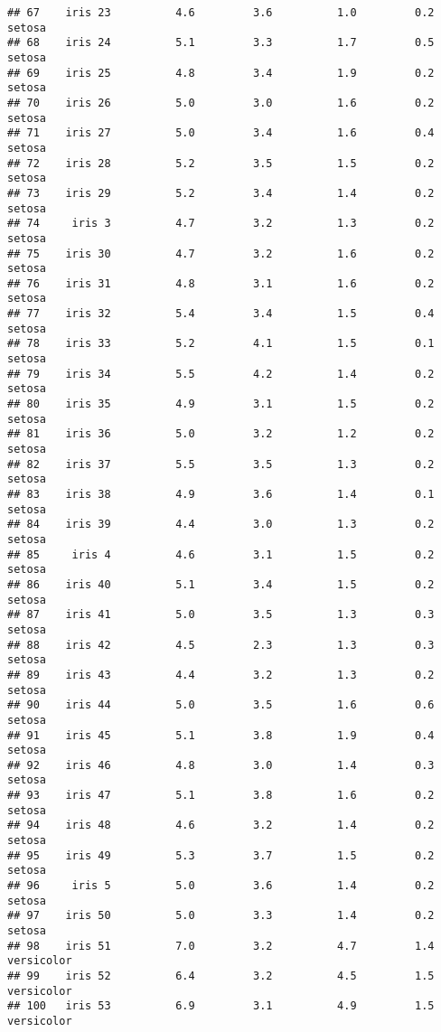 \documentclass[
]{article}
\begin{document}
\begin{verbatim}
## 67    iris 23          4.6         3.6          1.0         0.2     setosa
## 68    iris 24          5.1         3.3          1.7         0.5     setosa
## 69    iris 25          4.8         3.4          1.9         0.2     setosa
## 70    iris 26          5.0         3.0          1.6         0.2     setosa
## 71    iris 27          5.0         3.4          1.6         0.4     setosa
## 72    iris 28          5.2         3.5          1.5         0.2     setosa
## 73    iris 29          5.2         3.4          1.4         0.2     setosa
## 74     iris 3          4.7         3.2          1.3         0.2     setosa
## 75    iris 30          4.7         3.2          1.6         0.2     setosa
## 76    iris 31          4.8         3.1          1.6         0.2     setosa
## 77    iris 32          5.4         3.4          1.5         0.4     setosa
## 78    iris 33          5.2         4.1          1.5         0.1     setosa
## 79    iris 34          5.5         4.2          1.4         0.2     setosa
## 80    iris 35          4.9         3.1          1.5         0.2     setosa
## 81    iris 36          5.0         3.2          1.2         0.2     setosa
## 82    iris 37          5.5         3.5          1.3         0.2     setosa
## 83    iris 38          4.9         3.6          1.4         0.1     setosa
## 84    iris 39          4.4         3.0          1.3         0.2     setosa
## 85     iris 4          4.6         3.1          1.5         0.2     setosa
## 86    iris 40          5.1         3.4          1.5         0.2     setosa
## 87    iris 41          5.0         3.5          1.3         0.3     setosa
## 88    iris 42          4.5         2.3          1.3         0.3     setosa
## 89    iris 43          4.4         3.2          1.3         0.2     setosa
## 90    iris 44          5.0         3.5          1.6         0.6     setosa
## 91    iris 45          5.1         3.8          1.9         0.4     setosa
## 92    iris 46          4.8         3.0          1.4         0.3     setosa
## 93    iris 47          5.1         3.8          1.6         0.2     setosa
## 94    iris 48          4.6         3.2          1.4         0.2     setosa
## 95    iris 49          5.3         3.7          1.5         0.2     setosa
## 96     iris 5          5.0         3.6          1.4         0.2     setosa
## 97    iris 50          5.0         3.3          1.4         0.2     setosa
## 98    iris 51          7.0         3.2          4.7         1.4 versicolor
## 99    iris 52          6.4         3.2          4.5         1.5 versicolor
## 100   iris 53          6.9         3.1          4.9         1.5 versicolor

\end{verbatim}
\end{document}
